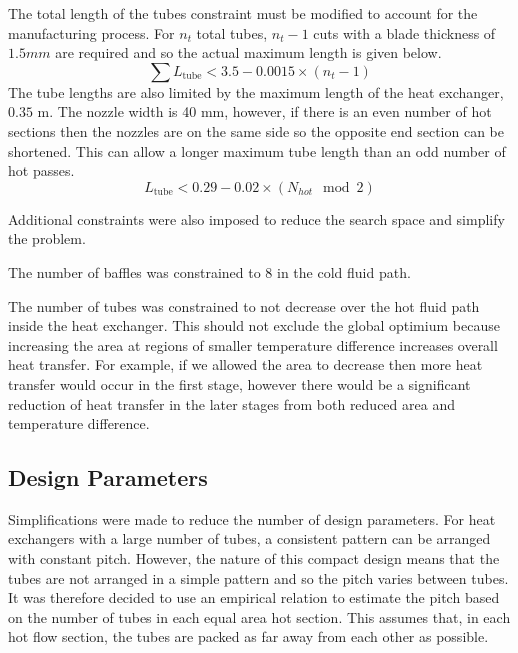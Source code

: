 \documentclass{article}
\begin{document}
The total length of the tubes constraint must be modified to account for the manufacturing process.
For $n_t$ total tubes, $n_t - 1$ cuts with a blade thickness of $1.5 mm$ are required and so the actual maximum length is given below.
\begin{equation}
  \sum L_\text{tube} < 3.5 - 0.0015 \times (n_t - 1)
\end{equation}
The tube lengths are also limited by the maximum length of the heat exchanger, $0.35$ m.
The nozzle width is 40 mm, however, if there is an even number of hot sections then the nozzles are on the same side so the opposite end section can be shortened.
This can allow a longer maximum tube length than an odd number of hot passes.
\begin{equation}
  L_\text{tube} < 0.29 - 0.02 \times ( N_{hot}\mod 2)
\end{equation}

Additional constraints were also imposed to reduce the search space and simplify the problem.

The number of baffles was constrained to 8 in the cold fluid path. %

The number of tubes was constrained to not decrease over the hot fluid path inside the heat exchanger.
This should not exclude the global optimium because increasing the area at regions of smaller temperature difference increases overall heat transfer.
For example, if we allowed the area to decrease then more heat transfer would occur in the first stage,
however there would be a significant reduction of heat transfer in the later stages from both reduced area and temperature difference.

\subsection{Design Parameters}

Simplifications were made to reduce the number of design parameters.
For heat exchangers with a large number of tubes, a consistent pattern can be arranged with constant pitch.
However, the nature of this compact design means that the tubes are not arranged in a simple pattern and so the pitch varies between tubes.
It was therefore decided to use an empirical relation to estimate the pitch based on the number of tubes in each equal area hot section.
This assumes that, in each hot flow section, the tubes are packed as far away from each other as possible.
\end{document}
